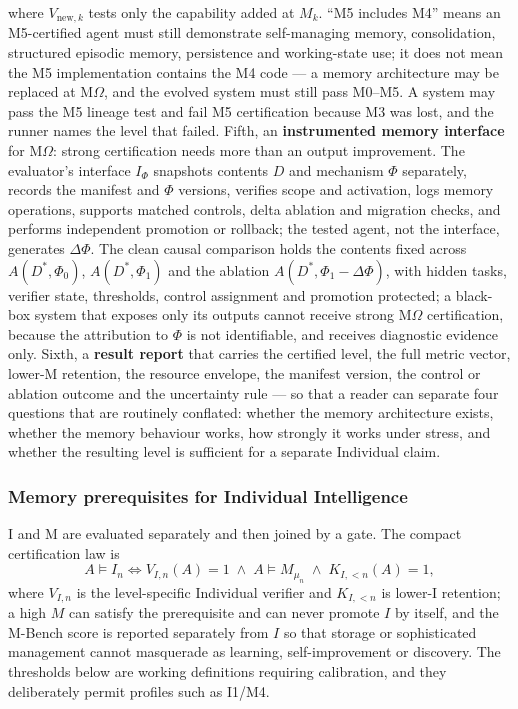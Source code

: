 \documentclass[11pt]{article}
\theoremstyle{definition}
\newcommand{\Om}{\ensuremath{\Omega}}
\begin{document}
where $V_{\mathrm{new},k}$ tests only the capability added at $M_k$. ``M5 includes M4'' means an M5-certified agent must still demonstrate self-managing memory, consolidation, structured episodic memory, persistence and working-state use; it does not mean the M5 implementation contains the M4 code --- a memory architecture may be replaced at M\Om{}, and the evolved system must still pass M0--M5. A system may pass the M5 lineage test and fail M5 certification because M3 was lost, and the runner names the level that failed. Fifth, an \textbf{instrumented memory interface} for M\Om{}: strong certification needs more than an output improvement. The evaluator's interface $I_\Phi$ snapshots contents $D$ and mechanism $\Phi$ separately, records the manifest and $\Phi$ versions, verifies scope and activation, logs memory operations, supports matched controls, delta ablation and migration checks, and performs independent promotion or rollback; the tested agent, not the interface, generates $\Delta\Phi$. The clean causal comparison holds the contents fixed across $A(D^{*},\Phi_0)$, $A(D^{*},\Phi_1)$ and the ablation $A(D^{*},\Phi_1 - \Delta\Phi)$, with hidden tasks, verifier state, thresholds, control assignment and promotion protected; a black-box system that exposes only its outputs cannot receive strong M\Om{} certification, because the attribution to $\Phi$ is not identifiable, and receives diagnostic evidence only. Sixth, a \textbf{result report} that carries the certified level, the full metric vector, lower-M retention, the resource envelope, the manifest version, the control or ablation outcome and the uncertainty rule --- so that a reader can separate four questions that are routinely conflated: whether the memory architecture exists, whether the memory behaviour works, how strongly it works under stress, and whether the resulting level is sufficient for a separate Individual claim.

\subsubsection{Memory prerequisites for Individual Intelligence}

I and M are evaluated separately and then joined by a gate. The compact certification law is
\begin{equation}
A \models I_n \iff V_{I,n}(A) = 1 \;\wedge\; A \models M_{\mu_n} \;\wedge\; K_{I,<n}(A) = 1,
\end{equation}
where $V_{I,n}$ is the level-specific Individual verifier and $K_{I,<n}$ is lower-I retention; a high $M$ can satisfy the prerequisite and can never promote $I$ by itself, and the M-Bench score is reported separately from $I$ so that storage or sophisticated management cannot masquerade as learning, self-improvement or discovery. The thresholds below are working definitions requiring calibration, and they deliberately permit profiles such as I1/M4.
\end{document}
